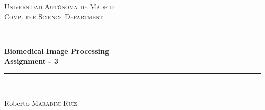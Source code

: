 \documentclass[12pt]{article} %
\begin{document}

\begin{titlepage}

\newcommand{\HRule}{\rule{\linewidth}{0.5mm}} %

\center %

\textsc{\LARGE Universidad Aut\'{o}noma de Madrid}\\[1.5cm] %
\textsc{\Large Computer Science Department}\\[0.5cm] %

\HRule \\[0.4cm]
{ \huge \bfseries Biomedical Image Processing\\[0.5cm] Assignment - 3}\\[0.4cm] %
\HRule \\[1.5cm]





\vfill %
\begin{flushright}
 \large
Roberto  \textsc{Marabini Ruiz} %
\end{flushright}

\end{titlepage}
\end{document}
